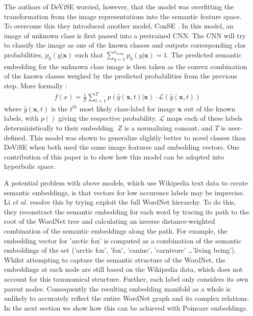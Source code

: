 \documentclass[12pt]{report}
\begin{document}
The authors of DeViSE worried, however, that the model was overfitting the transformation from the image representations into the semantic feature space. To overcome this they introduced another model, ConSE \cite{Norouzi2013}. In this model, an image of unknown class is first passed into a pretrained CNN. The CNN will try to classify the image as one of the known classes and outputs corresponding clas probabilities, $p_0 (y | \mathbf{x})$ such that $\sum_{y=1}^{n_{seen}} p_0 (y | \mathbf{x}) = 1$. The predicted semantic embedding for the unknown class image is then taken as the convex combination of the known classes weighed by the predicted probabilities from the previous step. More formally \cite{Norouzi2013}:
\begin{align}
  f(x) = \frac{1}{Z}\sum_{t=1}^T p(\hat{y}(\mathbf{x}, t)| \mathbf{x}) \cdot \mathcal{L}(\hat{y}(\mathbf{x}, t))
\end{align}
where $\hat{y}(\mathbf{x}, t)$ is the $t^{th}$ most likely class-label for image $\mathbf{x}$ out of the known labels, with $p()$ giving the respective probability. $\mathcal{L}$ maps each of these labels deterministically to their embedding. $Z$ is a normalizing consant, and $T$ is user-defined. This model was shown to generalize slightly better to novel classes than DeViSE when both used the same image features and embedding vectors. One contribution of this paper is to show how this model can be adapted into hyperbolic space.

A potential problem with above models, which use Wikipedia text data to create semantic embeddings, is that vectors for low occurence labels may be imprecise. Li \textit{et al.} \cite{} resolve this by trying exploit the full WordNet hierarchy. To do this, they reconstract the semantic embedding for each word by tracing its path to the root of the WordNet tree and calculating an inverse distance-weighted combination of the semantic embeddings along the path. For example, the embedding vector for 'arctic fox' is computed as a combination of the semantic embeddings of the set ('arctic fox', 'fox', 'canine', 'carnivore' \dots 'living being'). Whilst attempting to capture the semantic structure of the WordNet, the embeddings at each node are still based on the Wikipedia data, which does not account for this taxonomical structure. Further, each label only considers its own parent nodes. Consequently the resulting embedding manifold as a whole is unlikely to accurately reflect the entire WordNet graph and its complex relations. In the next section we show how this can be achieved with Poincare embeddings.
\end{document}
